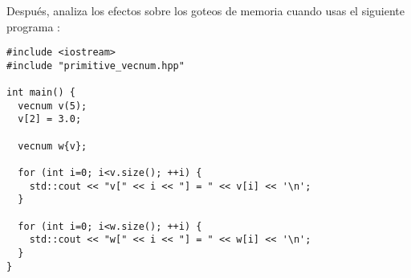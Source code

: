 Después, analiza los efectos sobre los goteos de memoria cuando usas el siguiente programa :

\begin{lstlisting}
#include <iostream>
#include "primitive_vecnum.hpp"

int main() {
  vecnum v(5);
  v[2] = 3.0;

  vecnum w{v};

  for (int i=0; i<v.size(); ++i) {
    std::cout << "v[" << i << "] = " << v[i] << '\n';
  }

  for (int i=0; i<w.size(); ++i) {
    std::cout << "w[" << i << "] = " << w[i] << '\n';
  }
}
\end{lstlisting}

